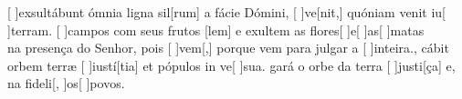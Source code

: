{  {[ ]{ex}sultábunt ómnia ligna sil[rum] a fácie Dómini, [ ]{ve}[nit,] quóniam venit iu[ ]{ter}ram.}%
    {[ ]{cam}pos com seus frutos [lem] e exultem as flores[ ]{e}[ ]{as}[ ]{ma}tas \\[5pt] na presença do Senhor, pois [ ]{vem}[,] porque vem para julgar a [ ]{in}{tei}ra.},
  {cábit orbem terræ [ ]{iu}{stí}[tia] et pópulos in ve[ ]{su}a.}%
    {gará o orbe da terra [ ]{jus}{ti}[ça] e, na fideli[, ]{os}[ ]{po}vos.}
}